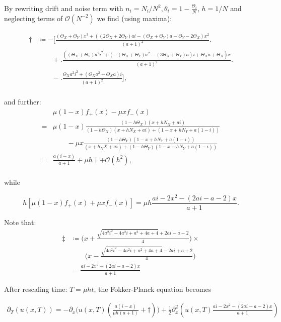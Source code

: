 By rewriting drift and noise term with $n_i = N_i/N^2, \theta_i = 1- \frac{\Theta_i}{N}$, $h = 1/N$ and neglecting terms of $\mathcal{O}(N^{-2})$ we find (using maxima):

\begin{align*}
	\dagger &\coloneqq -\Big[\frac{(\Theta_X + \Theta_Y)x^3 + ((2\Theta_X + 2\Theta_Y)ai -(\Theta_X + \Theta_Y)a - \Theta_Y - 2\Theta_X)x^2}{(a+1)^2}\Big.\\
	&\qquad + \Big.\frac{((\Theta_X + \Theta_Y)a^2 i^2 + (- (\Theta_X + \Theta_Y)a^2 -(3\Theta_X + \Theta_Y)a)i + \Theta_X a + \Theta_X)x}{(a+1)^2}\Big.\\
	&\qquad - \Big.\frac{\Theta_X a^2 i^2 + (\Theta_X a^2 + \Theta_X a)i}{(a+1)^2}\Big],\\
\end{align*}

and further: 
\begin{align*}
	& \mu(1-x)f_+(x) - \mu xf_-(x)\\
	= & \mu(1-x) \frac{(1-h\Theta_X) (x+ hN_X+ ai)}{(1-h\Theta_X) (x + hN_X + ai) + (1-x + hN_Y + a(1-i))}\\
	&\qquad - \mu x \frac{(1-h\Theta_Y)(1-x+hN_Y+a(1-i))}{(x+h_NX+ai) + (1-h\Theta_Y)(1-x+hN_Y+a(1-i))}\\
	=& \frac{a(i-x)}{a+1} + \mu h \dagger + \mathcal{O}(h^2),\\
\end{align*}

while 

\begin{equation*}
h\left[\mu(1-x)f_+(x) + \mu xf_-(x)\right] = \mu h \frac{ai - 2x^2 - (2ai - a -2)x}{a+1}.
\end{equation*}

Note that:
\begin{align*}
	\ddagger &\coloneqq \Big(x+\frac{\sqrt{4a^2i^2-4a^2i+a^2+4a+4}+2ai-a-2}{4}\Big) \times\\
	&\qquad \Big(x-\frac{\sqrt{4a^2i^2-4a^2i+a^2+4a+4}-2ai+a+2}{4}\Big)\\
	&=\frac{ai - 2x^2 - (2ai - a -2)x}{a+1}
\end{align*}


After rescaling time: $T = \mu h t$, the Fokker-Planck equation becomes

\begin{align*}
	\partial_T \left(u\left(x, T\right)\right) = -\partial_x\big(u(x,T)\left(\frac{a(i-x)}{\mu h(a+1)} + \dagger \right)\big) + \frac{1}{2} \partial^2_x\left(u(x,T)\frac{ai - 2x^2 - (2ai - a -2)x}{a+1}\right)
\end{align*}

